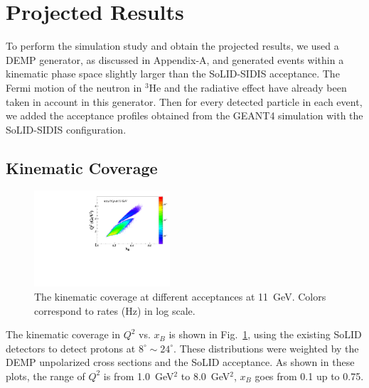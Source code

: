 \section{Projected Results}
To perform the simulation study and obtain the projected results, we used a
DEMP generator, as discussed in Appendix-A, and generated events within a
kinematic phase space slightly larger than the SoLID-SIDIS acceptance.  The
Fermi motion of the neutron in $\mathrm{^{3}He}$ and the radiative effect have
already been taken in account in this generator.  Then for every detected
particle in each event, we added the acceptance profiles obtained from the
GEANT4 simulation with the SoLID-SIDIS configuration.

\subsection{Kinematic Coverage}
\begin{figure}[!ht]
 \begin{center}
      \includegraphics[type=pdf,
        ext=.pdf,read=.pdf,width=0.45\textwidth]{./figures//E11_Q2_x_fermi}
  
   \caption[The kinematic coverage at different acceptances.]{\footnotesize{The
     kinematic coverage at different acceptances at 11~GeV. Colors correspond to rates
(Hz) in log scale.}}
  \label{kin_cor}
  \end{center}
\end{figure}
The kinematic coverage in $Q^{2}$ vs. $x_{B}$ is shown in Fig.~\ref{kin_cor},
using the existing SoLID detectors to detect protons at $8^{\circ}\sim24^{\circ}$. These distributions were
weighted by the DEMP unpolarized cross sections and the SoLID acceptance.
As shown in these plots, the range of $Q^{2}$ is from 1.0~GeV$^{2}$ to
8.0~GeV$^{2}$, $x_{B}$ goes from 0.1 up to 0.75.

